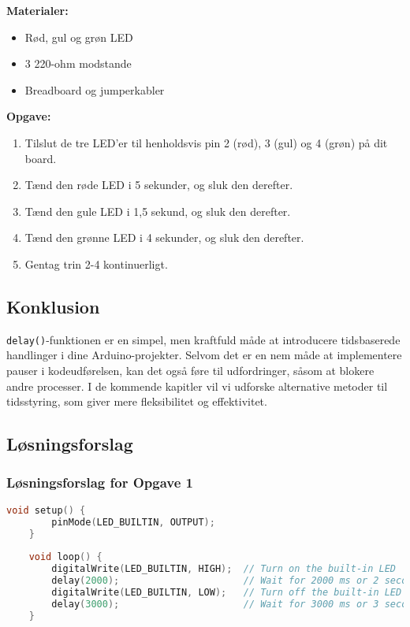 \textbf{Materialer:}
\begin{itemize}
	\item Rød, gul og grøn LED
	\item 3 220-ohm modstande
	\item Breadboard og jumperkabler
\end{itemize}

\textbf{Opgave:}
\begin{enumerate}
	\item Tilslut de tre LED'er til henholdsvis pin 2 (rød), 3 (gul) og 4 (grøn) på dit board.
	\item Tænd den røde LED i 5 sekunder, og sluk den derefter.
	\item Tænd den gule LED i 1,5 sekund, og sluk den derefter.
	\item Tænd den grønne LED i 4 sekunder, og sluk den derefter.
	\item Gentag trin 2-4 kontinuerligt.
\end{enumerate}

\subsection*{Konklusion}
\texttt{delay()}-funktionen er en simpel, men kraftfuld måde at introducere tidsbaserede handlinger i dine Arduino-projekter. Selvom det er en nem måde at implementere pauser i kodeudførelsen, kan det også føre til udfordringer, såsom at blokere andre processer. I de kommende kapitler vil vi udforske alternative metoder til tidsstyring, som giver mere fleksibilitet og effektivitet.

\subsection*{Løsningsforslag}

\subsubsection*{Løsningsforslag for Opgave 1}
\begin{lstlisting}[language=C++]
	void setup() {
		pinMode(LED_BUILTIN, OUTPUT);
	}
	
	void loop() {
		digitalWrite(LED_BUILTIN, HIGH);  // Turn on the built-in LED
		delay(2000);                      // Wait for 2000 ms or 2 seconds
		digitalWrite(LED_BUILTIN, LOW);   // Turn off the built-in LED
		delay(3000);                      // Wait for 3000 ms or 3 seconds
	}
\end{lstlisting}

